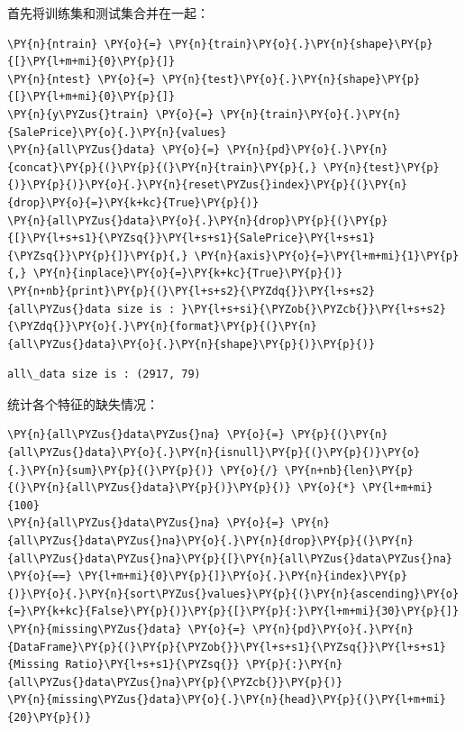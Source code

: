 \documentclass[no-math]{YangThesis}
\begin{document}
首先将训练集和测试集合并在一起：

\begin{tcolorbox}[breakable, size=fbox, boxrule=1pt, pad at break*=1mm,colback=cellbackground, colframe=cellborder]
	\begin{Verbatim}[commandchars=\\\{\}]
\PY{n}{ntrain} \PY{o}{=} \PY{n}{train}\PY{o}{.}\PY{n}{shape}\PY{p}{[}\PY{l+m+mi}{0}\PY{p}{]}
\PY{n}{ntest} \PY{o}{=} \PY{n}{test}\PY{o}{.}\PY{n}{shape}\PY{p}{[}\PY{l+m+mi}{0}\PY{p}{]}
\PY{n}{y\PYZus{}train} \PY{o}{=} \PY{n}{train}\PY{o}{.}\PY{n}{SalePrice}\PY{o}{.}\PY{n}{values}
\PY{n}{all\PYZus{}data} \PY{o}{=} \PY{n}{pd}\PY{o}{.}\PY{n}{concat}\PY{p}{(}\PY{p}{(}\PY{n}{train}\PY{p}{,} \PY{n}{test}\PY{p}{)}\PY{p}{)}\PY{o}{.}\PY{n}{reset\PYZus{}index}\PY{p}{(}\PY{n}{drop}\PY{o}{=}\PY{k+kc}{True}\PY{p}{)}
\PY{n}{all\PYZus{}data}\PY{o}{.}\PY{n}{drop}\PY{p}{(}\PY{p}{[}\PY{l+s+s1}{\PYZsq{}}\PY{l+s+s1}{SalePrice}\PY{l+s+s1}{\PYZsq{}}\PY{p}{]}\PY{p}{,} \PY{n}{axis}\PY{o}{=}\PY{l+m+mi}{1}\PY{p}{,} \PY{n}{inplace}\PY{o}{=}\PY{k+kc}{True}\PY{p}{)}
\PY{n+nb}{print}\PY{p}{(}\PY{l+s+s2}{\PYZdq{}}\PY{l+s+s2}{all\PYZus{}data size is : }\PY{l+s+si}{\PYZob{}\PYZcb{}}\PY{l+s+s2}{\PYZdq{}}\PY{o}{.}\PY{n}{format}\PY{p}{(}\PY{n}{all\PYZus{}data}\PY{o}{.}\PY{n}{shape}\PY{p}{)}\PY{p}{)}
	\end{Verbatim}
\end{tcolorbox}

\begin{Verbatim}[commandchars=\\\{\}]
all\_data size is : (2917, 79)
\end{Verbatim}

统计各个特征的缺失情况：

\begin{tcolorbox}[breakable, size=fbox, boxrule=1pt, pad at break*=1mm,colback=cellbackground, colframe=cellborder]
	\begin{Verbatim}[commandchars=\\\{\}]
\PY{n}{all\PYZus{}data\PYZus{}na} \PY{o}{=} \PY{p}{(}\PY{n}{all\PYZus{}data}\PY{o}{.}\PY{n}{isnull}\PY{p}{(}\PY{p}{)}\PY{o}{.}\PY{n}{sum}\PY{p}{(}\PY{p}{)} \PY{o}{/} \PY{n+nb}{len}\PY{p}{(}\PY{n}{all\PYZus{}data}\PY{p}{)}\PY{p}{)} \PY{o}{*} \PY{l+m+mi}{100}
\PY{n}{all\PYZus{}data\PYZus{}na} \PY{o}{=} \PY{n}{all\PYZus{}data\PYZus{}na}\PY{o}{.}\PY{n}{drop}\PY{p}{(}\PY{n}{all\PYZus{}data\PYZus{}na}\PY{p}{[}\PY{n}{all\PYZus{}data\PYZus{}na} \PY{o}{==} \PY{l+m+mi}{0}\PY{p}{]}\PY{o}{.}\PY{n}{index}\PY{p}{)}\PY{o}{.}\PY{n}{sort\PYZus{}values}\PY{p}{(}\PY{n}{ascending}\PY{o}{=}\PY{k+kc}{False}\PY{p}{)}\PY{p}{[}\PY{p}{:}\PY{l+m+mi}{30}\PY{p}{]}
\PY{n}{missing\PYZus{}data} \PY{o}{=} \PY{n}{pd}\PY{o}{.}\PY{n}{DataFrame}\PY{p}{(}\PY{p}{\PYZob{}}\PY{l+s+s1}{\PYZsq{}}\PY{l+s+s1}{Missing Ratio}\PY{l+s+s1}{\PYZsq{}} \PY{p}{:}\PY{n}{all\PYZus{}data\PYZus{}na}\PY{p}{\PYZcb{}}\PY{p}{)}
\PY{n}{missing\PYZus{}data}\PY{o}{.}\PY{n}{head}\PY{p}{(}\PY{l+m+mi}{20}\PY{p}{)}
	\end{Verbatim}
\end{tcolorbox}
\end{document}
